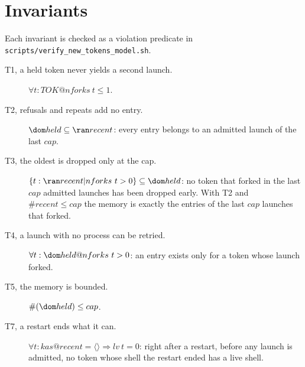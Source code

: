 \documentclass[a4paper,10pt,fleqn]{article}
\begin{document}
\section{Invariants}

Each invariant is checked as a violation predicate in
\texttt{scripts/verify\_new\_tokens\_model.sh}.

\begin{description}
  \item[T1, a held token never yields a second launch.]
    $\forall t : TOK @ nforks~t \leq 1$.
  \item[T2, refusals and repeats add no entry.]
    $\dom held \subseteq \ran recent$: every entry belongs to an admitted
    launch of the last $cap$.
  \item[T3, the oldest is dropped only at the cap.]
    $\{ t : \ran recent | nforks~t > 0 \} \subseteq \dom held$: no token that
    forked in the last $cap$ admitted launches has been dropped early.  With T2
    and $\# recent \leq cap$ the memory is exactly the entries of the last
    $cap$ launches that forked.
  \item[T4, a launch with no process can be retried.]
    $\forall t : \dom held @ nforks~t > 0$: an entry exists only for a token
    whose launch forked.
  \item[T5, the memory is bounded.] $\# (\dom held) \leq cap$.
  \item[T7, a restart ends what it can.] $\forall t : kas @ recent = \langle \rangle \Rightarrow lv~t = 0$: right after a restart, before any launch is admitted, no token whose shell the restart ended has a live shell.
\end{description}
\end{document}
